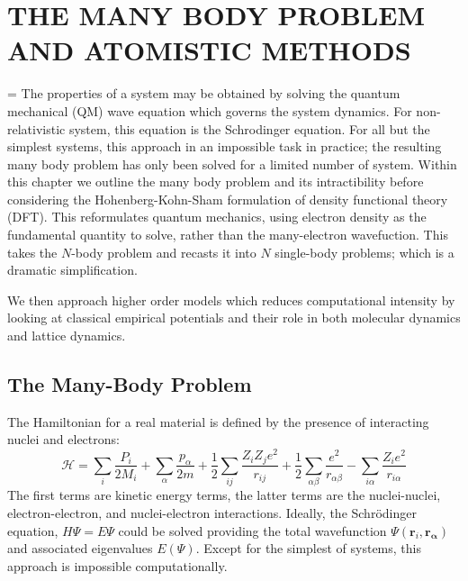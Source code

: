 \chapter{THE MANY BODY PROBLEM AND ATOMISTIC METHODS}
\hfuzz=20pt
\vfuzz=20pt
\vbadness=\maxdimen
The properties of a system may be obtained by solving the quantum mechanical (QM) wave equation which governs the system dynamics.  For non-relativistic system, this equation is the Schrodinger equation.  For all but the simplest systems, this approach in an impossible task in practice; the resulting many body problem has only been solved for a limited number of system.  Within this chapter we outline the many body problem and its intractibility before considering the Hohenberg-Kohn-Sham formulation of density functional theory (DFT).  This reformulates quantum mechanics, using electron density as the fundamental quantity to solve, rather than the many-electron wavefuction.  This takes the $N$-body problem and recasts it into $N$ single-body problems; which is a dramatic simplification.

We then approach higher order models which reduces computational intensity by looking at classical empirical potentials and their role in both molecular dynamics and lattice dynamics.

\section{The Many-Body Problem}

The Hamiltonian for a real material is defined by the presence of interacting nuclei and electrons:
\begin{equation}
	\mathcal{H} = \sum_i \frac{P_i}{2M_i}
	    + \sum_\alpha \frac{p_\alpha}{2m}
	    + \frac{1}{2} \sum_{ij} \frac{Z_i Z_j e^2}{r_{ij}}
	    + \frac{1}{2} \sum_{\alpha\beta} \frac{e^2}{r_{\alpha\beta}}
	    - \sum_{i\alpha} \frac{Z_i e^2}{r_{i\alpha}}
\end{equation}
The first terms are kinetic energy terms, the latter terms are the nuclei-nuclei, electron-electron, and nuclei-electron interactions.
Ideally, the Schr\"{o}dinger equation, $H\Psi=E\Psi$ could be solved providing the total wavefunction $\Psi(\bm{r}_i,\bm{r_\alpha})$ and associated eigenvalues $E(\Psi)$.
Except for the simplest of systems, this approach is impossible computationally.

